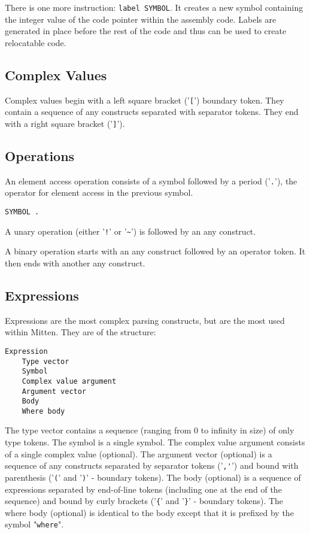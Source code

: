 \documentclass[10pt,a4paper]{article}
\begin{document}
There is one more instruction: \verb|label SYMBOL|. It creates a new symbol containing the integer value of the code pointer within the assembly code. Labels are generated in place before the rest of the code and thus can be used to create relocatable code.

\subsection{Complex Values}
\label{sec:complexValues}
Complex values begin with a left square bracket ('\verb|[|') boundary token. They contain a sequence of any constructs separated with separator tokens. They end with a right square bracket ('\verb|]|').

\subsection{Operations}
An element access operation consists of a symbol followed by a period ('\verb|.|'), the operator for element access in the previous symbol.
\begin{verbatim}
SYMBOL .
\end{verbatim}

A unary operation (either '\verb|!|' or '\verb|~|') is followed by an any construct.

A binary operation starts with an any construct followed by an operator token. It then ends with another any construct.

\subsection{Expressions}
\label{sec:expressions}
Expressions are the most complex parsing constructs, but are the most used within Mitten. They are of the structure:
\begin{verbatim}
Expression
    Type vector
    Symbol
    Complex value argument
    Argument vector
    Body
    Where body
\end{verbatim}

The type vector contains a sequence (ranging from 0 to infinity in size) of only type tokens. The symbol is a single symbol. The complex value argument consists of a single complex value (optional). The argument vector (optional) is a sequence of any constructs separated by separator tokens ('\verb|,'|') and bound with parenthesis ('\verb|(|' and '\verb|)|' - boundary tokens). The body (optional) is a sequence of expressions separated by end-of-line tokens (including one at the end of the sequence) and bound by curly brackets ('\verb|{|' and '\verb|}|' - boundary tokens). The where body (optional) is identical to the body except that it is prefixed by the symbol "\verb|where|".
\end{document}
